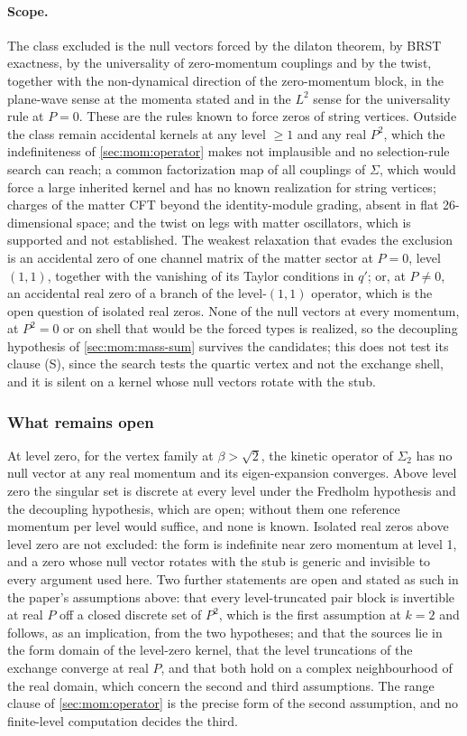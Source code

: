 \paragraph{Scope.}
The class excluded is the null vectors forced by the dilaton theorem, by BRST exactness, by the universality of zero-momentum couplings and by the twist, together with the non-dynamical direction of the zero-momentum block, in the plane-wave sense at the momenta stated and in the $L^2$ sense for the universality rule at $P = 0$.
These are the rules known to force zeros of string vertices.
Outside the class remain accidental kernels at any level $\ge 1$ and any real $P^2$, which the indefiniteness of \cref{sec:mom:operator} makes not implausible and no selection-rule search can reach; a common factorization map of all couplings of $\Sigma$, which would force a large inherited kernel and has no known realization for string vertices; charges of the matter CFT beyond the identity-module grading, absent in flat 26-dimensional space; and the twist on legs with matter oscillators, which is supported and not established.
The weakest relaxation that evades the exclusion is an accidental zero of one channel matrix of the matter sector at $P = 0$, level $(1, 1)$, together with the vanishing of its Taylor conditions in $q'$; or, at $P \ne 0$, an accidental real zero of a branch of the level-$(1, 1)$ operator, which is the open question of isolated real zeros.
None of the null vectors at every momentum, at $P^2 = 0$ or on shell that would be the forced types is realized, so the decoupling hypothesis of \cref{sec:mom:mass-sum} survives the candidates; this does not test its clause (S), since the search tests the quartic vertex and not the exchange shell, and it is silent on a kernel whose null vectors rotate with the stub.

\subsubsection{What remains open}
\label{sec:mom:open}

At level zero, for the vertex family at $\beta > \sqrt{2}$, the kinetic operator of $\Sigma_2$ has no null vector at any real momentum and its eigen-expansion converges.
Above level zero the singular set is discrete at every level under the Fredholm hypothesis and the decoupling hypothesis, which are open; without them one reference momentum per level would suffice, and none is known.
Isolated real zeros above level zero are not excluded: the form is indefinite near zero momentum at level 1, and a zero whose null vector rotates with the stub is generic and invisible to every argument used here.
Two further statements are open and stated as such in the paper's assumptions above: that every level-truncated pair block is invertible at real $P$ off a closed discrete set of $P^2$, which is the first assumption at $k = 2$ and follows, as an implication, from the two hypotheses; and that the sources lie in the form domain of the level-zero kernel, that the level truncations of the exchange converge at real $P$, and that both hold on a complex neighbourhood of the real domain, which concern the second and third assumptions.
The range clause of \cref{sec:mom:operator} is the precise form of the second assumption, and no finite-level computation decides the third.
